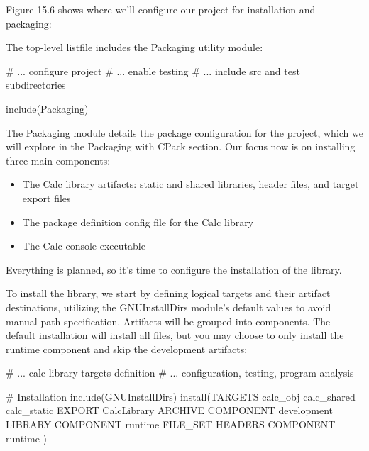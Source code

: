 
Figure 15.6 shows where we’ll configure our project for installation and packaging:


The top-level listfile includes the Packaging utility module:


\begin{cmake}
# ... configure project
# ... enable testing
# ... include src and test subdirectories

include(Packaging)
\end{cmake}

The Packaging module details the package configuration for the project, which we will explore in the Packaging with CPack section. Our focus now is on installing three main components:

\begin{itemize}
\item
The Calc library artifacts: static and shared libraries, header files, and target export files

\item
The package definition config file for the Calc library

\item
The Calc console executable
\end{itemize}

Everything is planned, so it’s time to configure the installation of the library.


To install the library, we start by defining logical targets and their artifact destinations, utilizing the GNUInstallDirs module’s default values to avoid manual path specification. Artifacts will be grouped into components. The default installation will install all files, but you may choose to only install the runtime component and skip the development artifacts:


\begin{cmake}
# ... calc library targets definition
# ... configuration, testing, program analysis

# Installation
include(GNUInstallDirs)
install(TARGETS calc_obj calc_shared calc_static
    EXPORT CalcLibrary
    ARCHIVE COMPONENT development
    LIBRARY COMPONENT runtime
    FILE_SET HEADERS COMPONENT runtime
)
\end{cmake}

